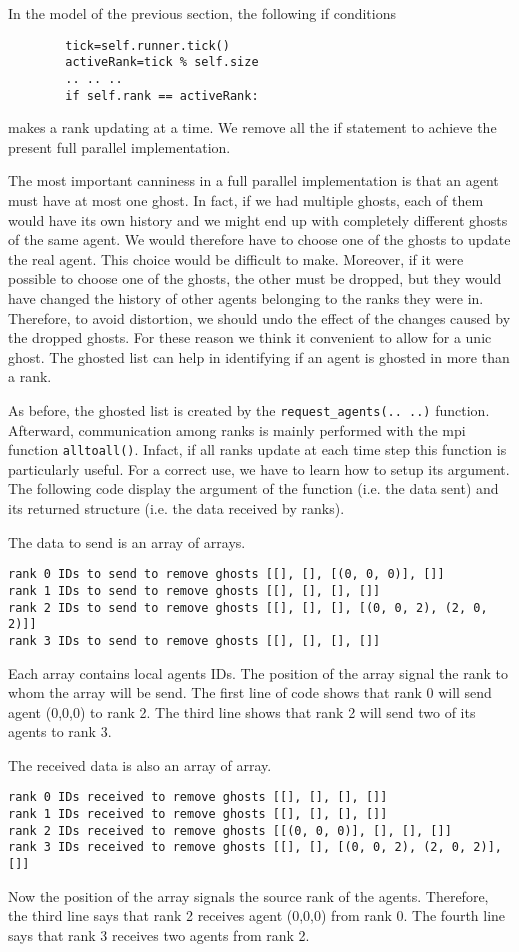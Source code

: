 \documentclass{article}
\begin{document}
In the model of the previous section, the following if conditions
\begin{verbatim}
        tick=self.runner.tick()
        activeRank=tick % self.size
        .. .. ..
        if self.rank == activeRank:
\end{verbatim}
makes a rank updating at a time. We remove all the if statement to achieve the present full parallel implementation.

The most important canniness in a full parallel implementation is that an agent must have at most one ghost. 
In fact, if we had multiple ghosts, each of them would have its own history and we might end up with completely different ghosts of the same agent. We would therefore have to choose one of the ghosts to update the real agent. This choice would be difficult to make. Moreover, if it were possible to choose one of the ghosts, the other must be dropped, but they would have changed the history of other agents belonging to the ranks they were in. Therefore, to avoid distortion, we should undo the effect of the changes caused by the dropped ghosts. For these reason we think it convenient to allow for a unic ghost.
The ghosted list can help in identifying if an agent is ghosted in more than a rank. 

As before, the ghosted list is created by the \verb+request_agents(.. ..)+ function.
Afterward, communication among ranks is mainly performed with the mpi function \verb+alltoall()+. Infact, if all ranks update at each time step this function is particularly useful. For a correct use, we have to learn how to setup its argument. The following code display the argument of the function (i.e. the data sent) and its returned structure (i.e. the data received by ranks).

The data to send is an array of arrays. 
\begin{verbatim}
rank 0 IDs to send to remove ghosts [[], [], [(0, 0, 0)], []]
rank 1 IDs to send to remove ghosts [[], [], [], []]
rank 2 IDs to send to remove ghosts [[], [], [], [(0, 0, 2), (2, 0, 2)]]
rank 3 IDs to send to remove ghosts [[], [], [], []]
\end{verbatim}
Each array contains local agents IDs. The position of the array signal the rank to whom the array will be send.
The first line of code shows that rank 0 will send agent (0,0,0) to rank 2. The third line shows that rank 2 will send two of its agents to rank 3.

The received data is also an array of array.
\begin{verbatim}
rank 0 IDs received to remove ghosts [[], [], [], []]
rank 1 IDs received to remove ghosts [[], [], [], []]
rank 2 IDs received to remove ghosts [[(0, 0, 0)], [], [], []]
rank 3 IDs received to remove ghosts [[], [], [(0, 0, 2), (2, 0, 2)], []]
\end{verbatim}
Now the position of the array signals the source rank of the agents. Therefore, the third line says that rank 2 receives agent (0,0,0) from rank 0. The fourth line says that rank 3 receives two agents from rank 2.
\end{document}

